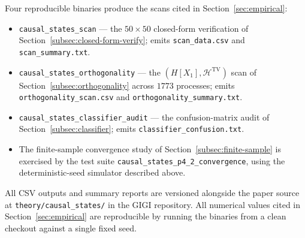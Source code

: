 \documentclass[11pt,a4paper]{article}
\theoremstyle{plain}
\theoremstyle{definition}
\theoremstyle{remark}
\begin{document}
Four reproducible binaries produce the scans cited in Section~\ref{sec:empirical}:
\begin{itemize}[itemsep=2pt,topsep=2pt]
    \item \texttt{causal\_states\_scan} --- the $50 \times 50$ closed-form verification of Section~\ref{subsec:closed-form-verify}; emits \texttt{scan\_data.csv} and \texttt{scan\_summary.txt}.
    \item \texttt{causal\_states\_orthogonality} --- the $(H[X_1], \mathcal{H}^{\mathrm{TV}})$ scan of Section~\ref{subsec:orthogonality} across $1773$ processes; emits \texttt{orthogonality\_scan.csv} and \texttt{orthogonality\_summary.txt}.
    \item \texttt{causal\_states\_classifier\_audit} --- the confusion-matrix audit of Section~\ref{subsec:classifier}; emits \texttt{classifier\_confusion.txt}.
    \item The finite-sample convergence study of Section~\ref{subsec:finite-sample} is exercised by the test suite \texttt{causal\_states\_p4\_2\_convergence}, using the deterministic-seed simulator described above.
\end{itemize}

All CSV outputs and summary reports are versioned alongside the paper source at \texttt{theory/causal\_states/} in the GIGI repository. All numerical values cited in Section~\ref{sec:empirical} are reproducible by running the binaries from a clean checkout against a single fixed seed.
\end{document}
